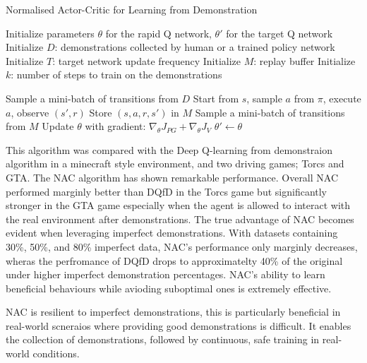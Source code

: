 \begin{algorithm}
\label{algo:nac-imperfect-demos}
\caption{Normalised Actor-Critic for Learning from Demonstration~\cite{fyp14-rl-imperfect-demos}}
\begin{algorithmic}[1] %
\State Initialize parameters $\theta$ for the rapid Q network, $\theta'$ for the target Q network
\State Initialize $D$: demonstrations collected by human or a trained policy network
\State Initialize $T$: target network update frequency
\State Initialize $M$: replay buffer
\State Initialize $k$: number of steps to train on the demonstrations

        \State Sample a mini-batch of transitions from $D$
    \Else
        \State Start from $s$, sample $a$ from $\pi$, execute $a$, observe $(s',r)$
        \State Store $(s, a, r, s')$ in $M$
        \State Sample a mini-batch of transitions from $M$
    \EndIf
    \State Update $\theta$ with gradient: $\nabla_\theta J_{PG} + \nabla_\theta J_V$
        \State $\theta' \gets \theta$
    \EndIf
\EndFor
\end{algorithmic}
\end{algorithm}

This algorithm was compared with the Deep Q-learning from demonstraion algorithm \cite{deepQLearningFromDemo} in a minecraft style environment, and two driving games; Torcs and GTA.
The NAC algorithm has shown remarkable performance.
Overall NAC performed marginly better than DQfD in the Torcs game but significantly stronger in the GTA game especially when the agent is allowed to interact with the real environment after demonstrations.
The true advantage of NAC becomes evident when leveraging imperfect demonstrations.
With datasets containing 30\%, 50\%, and 80\% imperfect data, NAC's performance only marginly decreases, wheras the perfromance of DQfD drops to approximatelty 40\% of the original under higher imperfect demonstration percentages.
NAC's ability to learn beneficial behaviours while avioding suboptimal ones is extremely effective.

NAC is resilient to imperfect demonstrations, this is particularly beneficial in real-world scneraios where providing good demonstrations is difficult.
It enables the collection of demonstrations, followed by continuous, safe training in real-world conditions. \\\\


